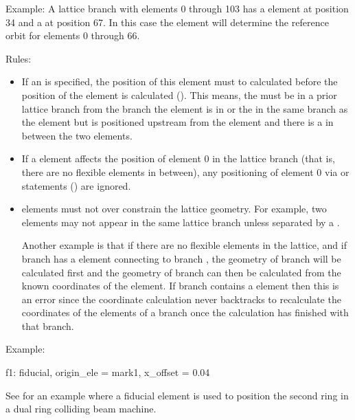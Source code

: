 Example: A lattice branch with elements 0 through 103 has a  element at position 34 and
a   at position 67. In this case the  element will determine the
reference orbit for elements 0 through 66.

Rules: 
  \begin{itemize}
  \item
If an  is specified, the position of this element must to calculated before the
position of the  element is calculated (). This means, the 
must be in a prior lattice branch from the branch the  element is in or the
 in the same branch as the  element but is positioned upstream from the
 element and there is a   in between the two elements.
  \item
If a  element affects the position of element 0 in the lattice branch (that is, there
are no flexible  elements in between), any positioning of element 0 via  or
 statements () are ignored.
  \item
{} elements must not over constrain the lattice geometry.  For example, two 
elements may not appear in the same lattice branch unless separated by a  .

Another example is that if there are no flexible  elements in the lattice, and if branch
 has a  element connecting to branch , the geometry of branch  will be
calculated first and the geometry of branch  can then be calculated from the known coordinates
of the  element. If branch  contains a  element then this is an error
since the coordinate calculation never backtracks to recalculate the coordinates of the elements of
a branch once the calculation has finished with that branch.
  \end{itemize}

Example:
\begin{example}
  f1: fiducial, origin_ele = mark1, x_offset = 0.04
\end{example}
See  for an example where a fiducial element is
used to position the second ring in a dual ring colliding beam 
machine.

\newpage

